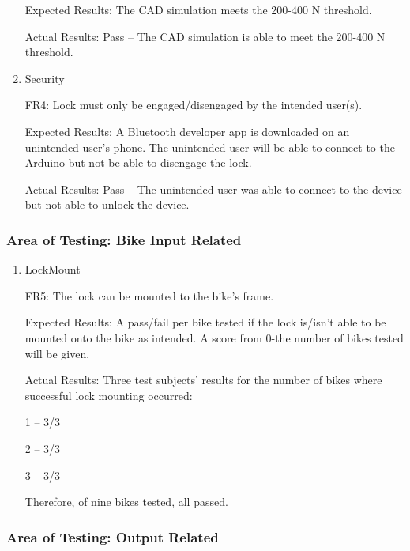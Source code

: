 \documentclass[12pt, titlepage]{article}
\begin{document}
\begin{enumerate}
Expected Results: The CAD simulation meets the 200-400 N threshold. 

Actual Results: Pass -- The CAD simulation is able to meet the 200-400 N threshold. 

\item{Security

FR4: Lock must only be engaged/disengaged by the intended user(s). }

Expected Results: A Bluetooth developer app is downloaded on an unintended user’s phone. The unintended user will be able to connect to the Arduino but not be able to disengage the lock. 

Actual Results: Pass -- The unintended user was able to connect to the device but not able to unlock the device. 

\end{enumerate}

\subsubsection{Area of Testing: Bike Input Related}

\begin{enumerate}

\item{LockMount

FR5: The lock can be mounted to the bike’s frame. }

Expected Results: A pass/fail per bike tested if the lock is/isn’t able to be mounted onto the bike as intended. A score from 0-the number of bikes tested will be given.  

Actual Results: Three test subjects’ results for the number of bikes where successful lock mounting occurred: 

1 – 3/3 

2 – 3/3 

3 – 3/3 

Therefore, of nine bikes tested, all passed. 

\end{enumerate}

\subsubsection{Area of Testing: Output Related}
\end{document}
